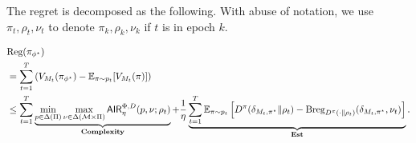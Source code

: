 The regret is decomposed as the following. With abuse of notation, we use $\pi_t, \rho_t, \nu_t$ to denote $\pi_k, \rho_k, \nu_k$ if $t$ is in epoch $k$. 

\begin{align}
&\text{\rm Reg}(\pi_{\phi^\star}) \nonumber
    \\&=\sum_{t=1}^T \left(V_{M_t}(\pi_{\phi^\star}) - \mathbb{E}_{\pi\sim p_t}[V_{M_t}(\pi)]\right)  \nonumber
    \\&\le   \sum_{t=1}^T \underbrace{\min_{p \in \Delta(\Pi)}\max_{\nu \in \Delta(\mathcal{M} \times \Pi)}\mathsf{AIR}^{\Phi, D}_\eta(p,\nu; \rho_t)}_{\textbf{Complexity}} + \frac{1}{\eta} \underbrace{\sum_{t=1}^T \mathbb{E}_{\pi\sim p_t}\left[D^{\pi}(\delta_{M_t,\pi^\star}\|\rho_t) - \textup{Breg}_{D^{\pi}(\cdot\|\rho_t)}(\delta_{M_t,\pi^\star}, \nu_t)\right] }_{\textbf{\textup{Est}}}. \label{eq:adv_bi_init_decom 2}
\end{align}




